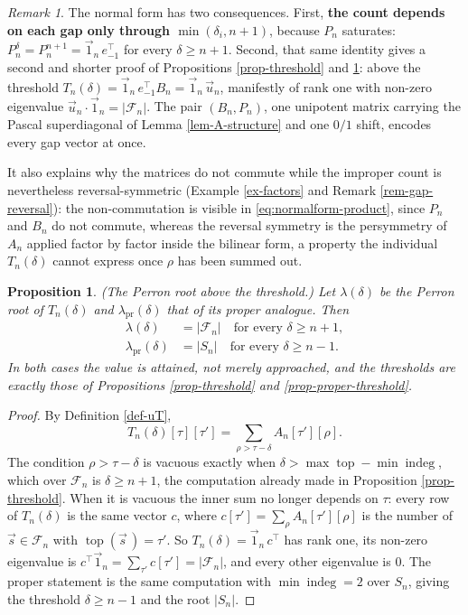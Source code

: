 \documentclass[11pt, a4paper, abstract=yes]{scrartcl}
\theoremstyle{definition}
\theoremstyle{remark}
\newtheorem{remark}[definition]{Remark}
\theoremstyle{plain}
\newtheorem{proposition}[definition]{Proposition}
\newcommand{\indeg}{\operatorname{indeg}}
\newcommand{\tp}{\operatorname{top}}
\begin{document}
\begin{remark}
The normal form has two consequences. First, \textbf{the count depends on each gap only through
\(\min(\delta_i,n+1)\)}, because \(P_n\) saturates: \(P_n^{\delta}=P_n^{n+1}=\vec1_n\,e_{-1}^{\!\top}\) for
every \(\delta\ge n+1\). Second, that same identity gives a second and shorter proof of
Propositions \ref{prop-threshold} and \ref{prop-perron-threshold}: above the threshold
\(T_n(\delta)=\vec1_n\,e_{-1}^{\!\top}B_n=\vec1_n\,\vec u_n\), manifestly of rank one with non-zero eigenvalue
\(\vec u_n\cdot\vec1_n=\lvert\mathcal F_n\rvert\). The pair \((B_n,P_n)\), one unipotent
matrix carrying the Pascal superdiagonal of Lemma \ref{lem-A-structure} and one \(0/1\) shift, encodes
every gap vector at once.

It also explains why the matrices do not commute while the improper count is nevertheless
reversal-symmetric
(Example \ref{ex-factors} and Remark \ref{rem-gap-reversal}): the non-commutation is visible in
\eqref{eq:normalform-product}, since \(P_n\) and \(B_n\) do not commute, whereas the reversal symmetry is the
persymmetry of \(A_n\) applied factor by factor inside the bilinear form, a property the individual
\(T_n(\delta)\) cannot express once \(\rho\) has been summed out.
\label{rem-normalform}
\end{remark}

\begin{proposition}
(\emph{The Perron root above the threshold.}) Let \(\lambda(\delta)\) be the Perron root of \(T_n(\delta)\)
and \(\lambda_{\mathrm{pr}}(\delta)\) that of its proper analogue. Then
\begin{align}
  \lambda(\delta) &= \lvert\mathcal F_n\rvert \quad\text{for every }\delta\ge n+1,\label{eq:perron-threshold}\\
  \lambda_{\mathrm{pr}}(\delta) &= \lvert S_n\rvert \quad\text{for every }\delta\ge n-1 .\label{eq:perron-threshold-pr}
\end{align}
In both cases the value is attained, not merely approached, and the thresholds are exactly those of
Propositions \ref{prop-threshold} and \ref{prop-proper-threshold}.
\label{prop-perron-threshold}
\end{proposition}

\begin{proof}
By Definition \ref{def-uT},
\[
  T_n(\delta)[\tau][\tau']=\sum_{\rho>\tau-\delta}A_n[\tau'][\rho] .
\]
The
condition \(\rho>\tau-\delta\) is vacuous exactly when \(\delta>\max\tp-\min\indeg\), which over
\(\mathcal F_n\) is \(\delta\ge n+1\), the computation already made in
Proposition \ref{prop-threshold}. When it is vacuous the inner sum no longer depends on \(\tau\):
every row of \(T_n(\delta)\) is the same vector \(c\), where \(c[\tau']=\sum_\rho A_n[\tau'][\rho]\) is
the number of \(\vec s\in\mathcal F_n\) with \(\tp(\vec s\,)=\tau'\). So \(T_n(\delta)=\vec1_n\,c^{\!\top}\)
has rank one, its non-zero eigenvalue is \(c^{\!\top}\vec1_n=\sum_{\tau'}c[\tau']=|\mathcal F_n|\), and
every other eigenvalue is \(0\). The proper statement is the same computation with \(\min\indeg=2\)
over \(S_n\), giving the threshold \(\delta\ge n-1\) and the root \(|S_n|\).
\end{proof}
\end{document}
